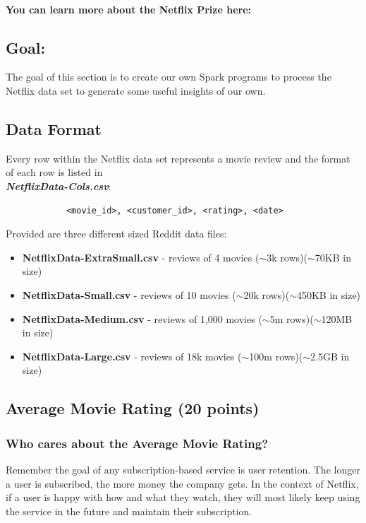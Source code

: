 \documentclass{article}
\begin{document}
\-\ \\ \noindent \textbf{You can learn more about the Netflix Prize here:} \href{https://en.wikipedia.org/wiki/Netflix_Prize}{\color{blue}{https://en.wikipedia.org/wiki/Netflix\_Prize}}


\subsection*{Goal:} The goal of this section is to create our own Spark programs to process the Netflix data set to generate some useful insights of our own.

\subsection*{Data Format}
Every row within the Netflix data set represents a movie review and the format of each row is listed in \\ \textbf{\textit{NetflixData-Cols.csv}}:

\large
\begin{verbatim}
            <movie_id>, <customer_id>, <rating>, <date>
\end{verbatim}
\normalsize


\noindent Provided are three different sized Reddit data files:
\begin{itemize}
    \item \textbf{NetflixData-ExtraSmall.csv} - reviews of 4 movies ($\sim$3k rows)($\sim$70KB in size)
    \item \textbf{NetflixData-Small.csv} - reviews of 10 movies ($\sim$20k rows)($\sim$450KB in size)
    \item \textbf{NetflixData-Medium.csv} - reviews of 1,000 movies ($\sim$5m rows)($\sim$120MB in size)
    \item \textbf{NetflixData-Large.csv} - reviews of 18k movies ($\sim$100m rows)($\sim$2.5GB in size)
\end{itemize}



\subsection{Average Movie Rating (20 points)}
\subsubsection*{Who cares about the Average Movie Rating?}
Remember the goal of any subscription-based service is user retention. The longer a user is subscribed, the more money the company gets. In the context of Netflix, if a user is happy with how and what they watch, they will most likely keep using the service in the future and maintain their subscription.
\end{document}
